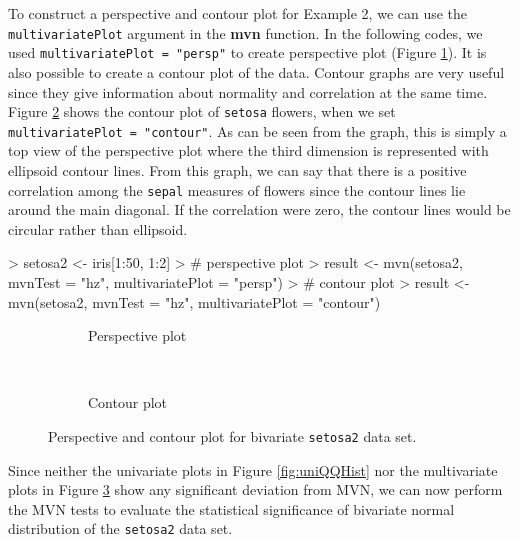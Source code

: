 \documentclass[11pt]{article}
\begin{document}
To construct a perspective and contour plot for Example 2, we can use the \texttt{multivariatePlot} argument in the \textbf{mvn} function. In the following codes, we used \texttt{multivariatePlot = "persp"} to create perspective plot (Figure \ref{fig:persp}). It is also possible to create a contour plot of the data. Contour graphs are very useful since they give information about normality and correlation at the same time. Figure \ref{fig:contour} shows the contour plot of \texttt{setosa} flowers, when we set \texttt{multivariatePlot = "contour"}.  As can be seen from the graph, this is simply a top view of the perspective plot where the third dimension is represented with ellipsoid contour lines.  From this graph, we can say that there is a positive correlation among the \texttt{sepal} measures of flowers since the contour lines lie around the main diagonal. If the correlation were zero, the contour lines would be circular rather than ellipsoid.


\begin{Schunk}
\begin{Sinput}
> setosa2 <- iris[1:50, 1:2]
> # perspective plot
> result <- mvn(setosa2, mvnTest = "hz", multivariatePlot = "persp")
> # contour plot
> result <- mvn(setosa2, mvnTest = "hz", multivariatePlot = "contour")
\end{Sinput}
\end{Schunk}

\begin{figure}[htb]
\centering
	\begin{subfigure}[b]{0.485\textwidth}
	\centering
\scalebox{0.75}{
}
		\caption{Perspective plot}
		\label{fig:persp}
	\end{subfigure}%
	~ 	%
	\begin{subfigure}[b]{0.485\textwidth}
	\centering
\scalebox{0.75}{
}
		\caption{Contour plot}
		\label{fig:contour}
	\end{subfigure}
\caption{Perspective and contour plot for bivariate \texttt{setosa2} data set.}\label{fig:PerspCont}
\end{figure}

Since neither the univariate plots in Figure \ref{fig:uniQQHist} nor the multivariate plots in Figure \ref{fig:PerspCont} show any significant deviation from MVN, we can now perform the MVN tests to evaluate the statistical significance of bivariate normal distribution of the \texttt{setosa2} data set.
\end{document}
